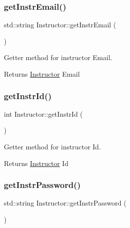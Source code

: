 \mbox{\label{class_instructor_a91cb628e3c244a451f121236cbb3bc20}} 
\subsubsection{\texorpdfstring{get\+Instr\+Email()}{getInstrEmail()}}
{\footnotesize\ttfamily std\+::string Instructor\+::get\+Instr\+Email (\begin{DoxyParamCaption}{ }\end{DoxyParamCaption})}



Getter method for instructor Email. 

\begin{DoxyReturn}{Returns}
\hyperlink{class_instructor}{Instructor} Email 
\end{DoxyReturn}
\mbox{\label{class_instructor_a7f9c4b2b1e3da3ca45d78a9f11a68fc0}} 
\subsubsection{\texorpdfstring{get\+Instr\+Id()}{getInstrId()}}
{\footnotesize\ttfamily int Instructor\+::get\+Instr\+Id (\begin{DoxyParamCaption}{ }\end{DoxyParamCaption})}



Getter method for instructor Id. 

\begin{DoxyReturn}{Returns}
\hyperlink{class_instructor}{Instructor} Id 
\end{DoxyReturn}
\mbox{\label{class_instructor_a1e57077ab77d5ca2ea2d853f7a79b279}} 
\subsubsection{\texorpdfstring{get\+Instr\+Password()}{getInstrPassword()}}
{\footnotesize\ttfamily std\+::string Instructor\+::get\+Instr\+Password (\begin{DoxyParamCaption}{ }\end{DoxyParamCaption})}




